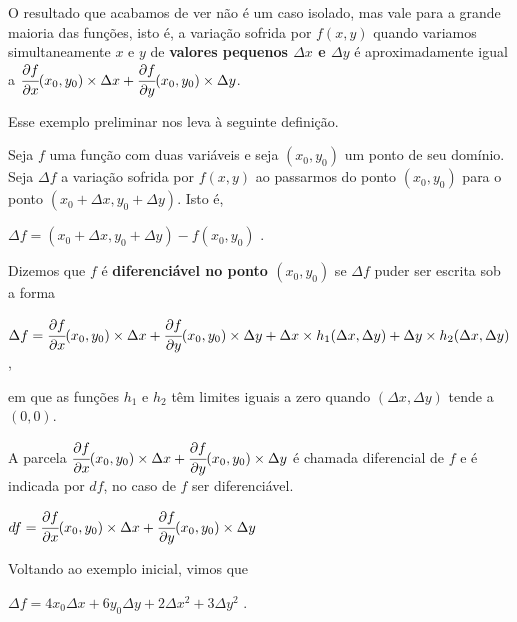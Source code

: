 		O resultado que acabamos de ver não é um caso isolado, mas vale para a grande maioria das funções, isto é, a variação sofrida por $f(x, y)$ quando variamos simultaneamente $x$ e $y$ de \textbf{valores pequenos $\Delta x$ e $\Delta y$} é aproximadamente igual a $\cfrac{\partial f}{\partial x} (x_{0}, y_{0}) \times \Delta x + \cfrac{\partial f}{\partial y} (x_{0}, y_{0}) \times \Delta y$.

		Esse exemplo preliminar nos leva à seguinte definição.

		Seja $f$ uma função com duas variáveis e seja $(x_{0}, y_{0})$ um ponto de seu domínio. Seja $\Delta f$ a variação sofrida por $f(x, y)$ ao passarmos do ponto $(x_{0}, y_{0})$ para o ponto $(x_{0} + \Delta x, y_{0} + \Delta y)$. Isto é,

		\medskip

		$\Delta f = (x_{0} + \Delta x, y_{0} + \Delta y) - f(x_{0}, y_{0})$ .

		\medskip

		Dizemos que $f$ é \textbf{diferenciável no ponto $(x_{0}, y_{0})$} se $\Delta f$ puder ser escrita sob a forma

		\medskip

		$\Delta f = \cfrac{\partial f}{\partial x} (x_{0}, y_{0}) \times \Delta x + \cfrac{\partial f}{\partial y} (x_{0}, y_{0}) \times \Delta y + \Delta x \times h_{1}(\Delta x, \Delta y) + \Delta y \times h_{2}(\Delta x, \Delta y)$,

		\medskip

		em que as funções $h_{1}$ e $h_{2}$ têm limites iguais a zero quando $(\Delta x, \Delta y)$ tende a $(0, 0)$.

		\medskip

		A parcela $\cfrac{\partial f}{\partial x} (x_{0}, y_{0}) \times \Delta x + \cfrac{\partial f}{\partial y} (x_{0}, y_{0}) \times \Delta y$ é chamada diferencial de $f$ e é indicada por $df$, no caso de $f$ ser diferenciável.

		\bigskip

		{\LARGE $df = \cfrac{\partial f}{\partial x} (x_{0}, y_{0}) \times \Delta x + \cfrac{\partial f}{\partial y} (x_{0}, y_{0}) \times \Delta y$}

		\bigskip

		Voltando ao exemplo inicial, vimos que

		\medskip

		$\Delta f = 4x_{0}\Delta x + 6y_{0}\Delta y + 2\Delta x^{2} + 3\Delta y^{2}$ .

		\medskip

